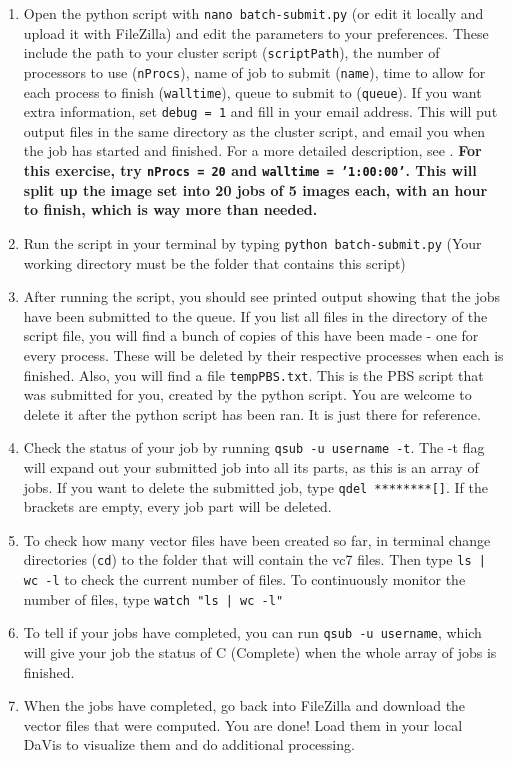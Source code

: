\documentclass{article}
\begin{document}
\begin{enumerate}
    	\item Open the python script with \texttt{nano batch-submit.py} (or edit it locally and upload it with FileZilla) and edit the parameters to your preferences.  These include the path to your cluster script (\texttt{scriptPath}), the number of processors to use (\texttt{nProcs}), name of job to submit (\texttt{name}), time to allow for each process to finish (\texttt{walltime}), queue to submit to (\texttt{queue}).  If you want extra information, set \texttt{debug = 1} and fill in your email address.  This will put output files in the same directory as the cluster script, and email you when the job has started and finished.  For a more detailed description, see . \textbf{For this exercise, try \texttt{nProcs = 20} and \texttt{walltime = '1:00:00'}.  This will split up the image set into 20 jobs of 5 images each, with an hour to finish, which is way more than needed.}
    	
    	\item Run the script in your terminal by typing \texttt{python batch-submit.py} (Your working directory must be the folder that contains this script)
    	
    	\item After running the script, you should see printed output showing that the jobs have been submitted to the queue.  If you list all files in the directory of the script file, you will find a bunch of copies of this have been made - one for every process.  These will be deleted by their respective processes when each is finished.  Also, you will find a file \texttt{tempPBS.txt}.  This is the PBS script that was submitted for you, created by the python script.  You are welcome to delete it after the python script has been ran.  It is just there for reference.
    	
    	\item Check the status of your job by running \texttt{qsub -u username -t}.  The -t flag will expand out your submitted job into all its parts, as this is an array of jobs.  If you want to delete the submitted job, type \texttt{qdel ********[]}.  If the brackets are empty, every job part will be deleted.
    	
    	\item To check how many vector files have been created so far, in terminal change directories (\texttt{cd}) to the folder that will contain the vc7 files.  Then type \texttt{ls | wc -l} to check the current number of files.  To continuously monitor the number of files, type \texttt{watch "ls | wc -l"}
    	
    	\item To tell if your jobs have completed, you can run \texttt{qsub -u username}, which will give your job the status of C (Complete) when the whole array of jobs is finished.  
    	
    	\item When the jobs have completed, go back into FileZilla and download the vector files that were computed.  You are done!  Load them in your local DaVis to visualize them and do additional processing.
    	
    	
	\end{enumerate}
    
\end{document}
